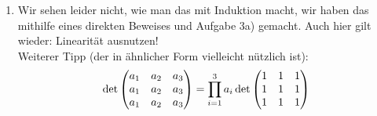 {\begin{enumerate}
\begin{enumerate}
\begin{equation*}
            \det A= \prod_{i=1}^n a_i+\sum_{k=1}^nb_k\prod_{j\neq k}^n c_j
        \end{equation*}
        kommen.
        \item Wir sehen leider nicht, wie man das mit Induktion macht, wir haben das mithilfe eines direkten Beweises und Aufgabe 3a) gemacht. Auch hier gilt wieder: Linearität ausnutzen!\\
        Weiterer Tipp (der in ähnlicher Form vielleicht nützlich ist):
        \begin{equation*}
            \det\begin{pmatrix}a_1&a_2&a_3\\a_1&a_2&a_3\\a_1&a_2&a_3\end{pmatrix}=\prod_{i=1}^3a_i\det\begin{pmatrix}1&1&1\\1&1&1\\1&1&1\end{pmatrix}
        \end{equation*}
    \end{enumerate}
\end{enumerate}
}


